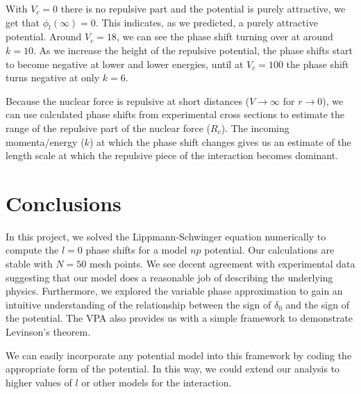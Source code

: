 \documentclass[10pt,showpacs,preprintnumbers,footinbib,amsmath,amssymb,aps,prl,twocolumn,groupedaddress,superscriptaddress,showkeys]{revtex4-1}
\begin{document}
With $V_c=0$ there is no repulsive part and the potential is purely attractive, we get that
$\phi_l(\infty)=0$. This indicates, as we predicted, a purely attractive potential.
Around $V_c=18$, we can see the phase shift turning over at around $k=10$. As we increase
the height of the repulsive potential, the phase shifts start to become negative at lower and
lower energies, until at $V_c=100$ the phase shift turns negative at only $k=6$. 

Because the nuclear force is repulsive at short distances ($V \rightarrow \infty$ for $r \rightarrow 0$),
we can use calculated phase shifts from experimental cross sections to estimate the range
of the repulsive part of the nuclear force ($R_c$). The incoming momenta/energy ($k$) at which the
phase shift changes gives us an estimate of the length scale at which the repulsive piece of the
interaction becomes dominant.



\section{Conclusions}

In this project, we solved the Lippmann-Schwinger equation numerically to compute
the $l=0$ phase shifts for a model $np$ potential. Our calculations are stable with
$N=50$ mesh points. We see decent agreement with experimental data suggesting
that our model does a reasonable job of describing the underlying physics. Furthermore,
we explored the variable phase approximation to gain an intuitive understanding of
the relationship between the sign of $\delta_0$ and the sign of the potential. The
VPA also provides us with a simple framework to demonstrate Levinson's theorem.

We can easily incorporate any potential model into this framework by coding
the appropriate form of the potential. In this way, we could extend our analysis
to higher values of $l$ or other models for the interaction.




\end{document}
